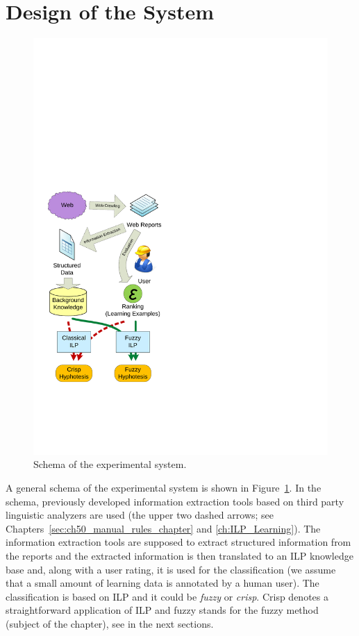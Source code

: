 \section{Design of the System} \label{sec:system}
\begin{figure}
\centerline{\includegraphics[width=0.4\hsize]{schema}}
\caption{Schema of the experimental system.}
\label{img:schema}
\end{figure}


A general schema of the experimental system is shown in Figure~\ref{img:schema}. In the schema, previously developed information extraction tools based on third party linguistic analyzers are used (the upper two dashed arrows; see Chapters~\ref{sec:ch50_manual_rules_chapter} and \ref{ch:ILP_Learning}). The information extraction tools are supposed to extract structured information from the reports and the extracted information is then translated to an ILP knowledge base and, along with a user rating, it is used for the classification (we assume that a small amount of learning data is annotated by a human user). The classification is based on ILP and it could be \emph{fuzzy} or \emph{crisp}. Crisp denotes a straightforward application of ILP and fuzzy stands for the fuzzy method (subject of the chapter), see in the next sections.



%


